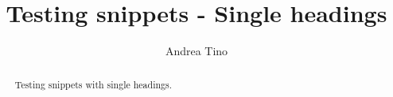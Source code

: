 \documentclass{article}
\begin{document}
\title{Testing snippets - Single headings}
\author{Andrea Tino}

\maketitle

\begin{abstract}
Testing snippets with single headings.
\end{abstract}


\end{document}
